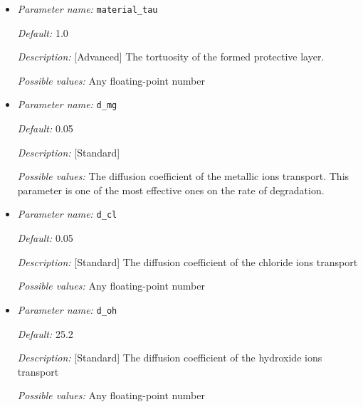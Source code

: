 \begin{itemize}
{\it Default:} 0.55

{\it Description:} [Advanced] The porosity of the formed protective layer in the range [0, 1].

{\it Possible values:} Any floating-point number between 0 and 1


\item {\it Parameter name:} {\tt material\_tau}
\label{parameters:material_tau}


{\it Default:} 1.0

{\it Description:} [Advanced] The tortuosity of the formed protective layer.

{\it Possible values:} Any floating-point number


\item {\it Parameter name:} {\tt d\_mg}
\label{parameters:d_mg}


{\it Default:} 0.05

{\it Description:} [Standard] 

{\it Possible values:} The diffusion coefficient of the metallic ions transport. This parameter is one of the most effective ones on the rate of degradation.


\item {\it Parameter name:} {\tt d\_cl}
\label{parameters:d_cl}


{\it Default:} 0.05

{\it Description:} [Standard] The diffusion coefficient of the chloride ions transport

{\it Possible values:} Any floating-point number


\item {\it Parameter name:} {\tt d\_oh}
\label{parameters:d_oh}


{\it Default:} 25.2

{\it Description:} [Standard] The diffusion coefficient of the hydroxide ions transport

{\it Possible values:} Any floating-point number



\end{itemize}
